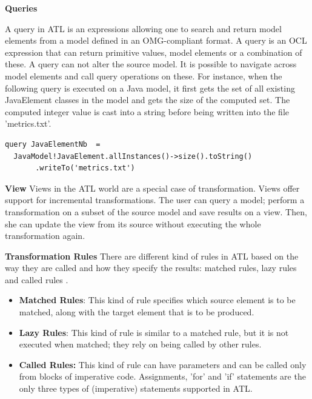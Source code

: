 \textbf{Queries}

A query in ATL is an expressions allowing one to search and return model elements from a model defined in an OMG-compliant format. A query is an OCL expression that can return primitive values, model elements or a combination of these. A query can not alter the source model. It is possible to navigate across model elements and call query operations on these. For instance, when the following query is executed on a Java model, it first gets the set of all existing JavaElement classes in the model and gets the size of the computed set. The computed integer value is cast into a string before being written into the file 'metrics.txt'. 

\vspace{\baselineskip}
\begin{lstlisting}[style=umplePlain]
query JavaElementNb  =
  JavaModel!JavaElement.allInstances()->size().toString()
       .writeTo('metrics.txt')
\end{lstlisting}


\textbf{View}
Views in the ATL world are a special case of transformation. Views offer support for incremental transformations. The user can query a model; perform a transformation on a subset of the source model and save results on a view. Then, she can update the view from its source without executing the whole transformation again. 

\textbf{Transformation Rules}
There are different kind of rules in ATL based on the way they are called and how they specify the results: matched rules, lazy rules and called rules \cite{stephan2009comparative}.

\begin{itemize}
\item \textbf{Matched Rules}: 	This kind of rule specifies which source element is to be matched, along with the target element that is to be produced.

\item \textbf{Lazy Rules}: This kind of rule is similar to a matched rule, but it is not executed when matched; they rely on being called by other rules.

\item \textbf{Called Rules:}	This kind of rule can have parameters and can be called only from blocks of imperative code. Assignments, 'for' and 'if' statements are the only three types of (imperative) statements supported in ATL.

\end{itemize}

